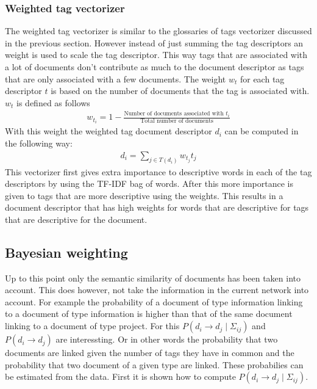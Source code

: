 \subsubsection{Weighted tag vectorizer}
The weighted tag vectorizer is similar to the glossaries of tags vectorizer
discussed in the previous section. However instead of just summing the tag
descriptors an weight is used to scale the tag descriptor. This way tags that
are associated with a lot of documents don't contribute as much to the document
descriptor as tags that are only associated with a few documents. The weight
$w_t$ for each tag descriptor $t$ is based on the number of documents that the
tag is associated with. $w_t$ is defined as follows
\begin{align}
  w_{t_i} = 1 - \frac{\textrm{Number of documents associated with $t_i$}}{\textrm{Total number of documents}}
\end{align}
With this weight the weighted tag document descriptor $d_i$ can be computed
in the following way:
\begin{align}
  d_i = \sum_{j \in T(d_i)} w_{t_j}t_j
\end{align}
This vectorizer first gives extra importance to descriptive words in each of
the tag descriptors by using the TF-IDF bag of words. After this more
importance is given to tags that are more descriptive using the weights. This
results in a document descriptor that has high weights for words that are
descriptive for tags that are descriptive for the document.

\subsection{Bayesian weighting}
Up to this point only the semantic similarity of documents has been taken into
account. This does however, not take the information in the current network
into account. For example the probability of a document of type information
linking to a document of type information is higher than that of the same
document linking to a document of type project. For this $P(d_i \to d_j \mid
\Sigma_{ij})$ and $P(d_i \to d_j)$ are interessting. Or in other words the
probability that two documents are linked given the number of tags they have in
common and the probability that two document of a given type are linked. These
probabilies can be estimated from the data. First it is shown how to compute
$P(d_i \to d_j \mid \Sigma_{ij})$.

